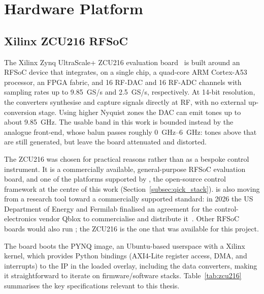 \section{Hardware Platform}
\label{sec:hardware}

\subsection{Xilinx ZCU216 RFSoC}

The Xilinx Zynq UltraScale+ ZCU216 evaluation board~\cite{ZCU216} is built around an RFSoC
device that integrates, on a single chip, a quad-core ARM Cortex-A53 processor,
an FPGA fabric, and 16 RF-DAC and 16 RF-ADC channels with sampling rates up to
\SI{9.85}{\giga S/s} and \SI{2.5}{\giga S/s}, respectively.  At 14-bit resolution,
the converters synthesise and capture signals directly at RF, with no external
up-conversion stage.  Using higher Nyquist zones the DAC can emit tones up to about
\SI{9.85}{\giga\hertz}.  The usable band
in this work is bounded instead by the analogue front-end, whose balun passes
roughly \SIrange{0}{6}{\giga\hertz}: tones above that are still generated, but leave
the board attenuated and distorted.

The ZCU216 was chosen for practical reasons rather than as a bespoke control
instrument.  It is a commercially available, general-purpose RFSoC evaluation
board, and one of the platforms
supported by \QICK{}, the open-source control framework at the centre of this work
(Section~\ref{subsec:qick_stack}).  \QICK{} is also moving from a research tool
toward a commercially supported standard: in 2026 the US Department of Energy and
Fermilab finalised an agreement for the control-electronics vendor Qblox to
commercialise and distribute it~\cite{QbloxQICK2026}.  Other RFSoC boards would
also run \QICK{}; the ZCU216 is the one that was available for this project.

The board boots the PYNQ image, an Ubuntu-based userspace with a Xilinx kernel,
which provides Python bindings (AXI4-Lite register access, DMA, and interrupts) to
the IP in the loaded overlay, including the data converters, making it
straightforward to iterate on firmware/software stacks.  Table~\ref{tab:zcu216}
summarises the key specifications relevant to this thesis.


